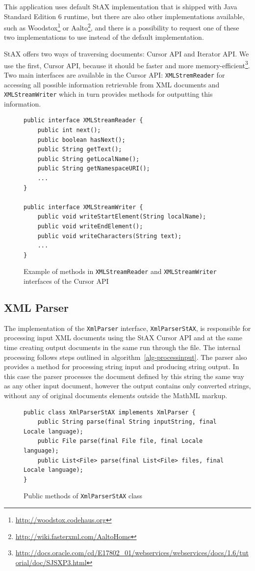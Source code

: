 \documentclass[11pt,oneside,final]{fithesis2}
\begin{document}
This application uses default StAX implementation that is shipped with Java Standard Edition 6 runtime, but there are also other implementations available, such as Woodstox\footnote{\url{http://woodstox.codehaus.org}} or Aalto\footnote{\url{http://wiki.fasterxml.com/AaltoHome}}, and there is a possibility to request one of these two implementations to use instead of the default implementation.

StAX offers two ways of traversing documents: Cursor API and Iterator API. We use the first, Cursor API, because it should be faster and more memory-efficient\footnote{\url{http://docs.oracle.com/cd/E17802_01/webservices/webservices/docs/1.6/tutorial/doc/SJSXP3.html}}. Two main interfaces are available in the Cursor API: \texttt{XMLStremReader} for accessing all possible information retrievable from XML documents and \texttt{XMLStreamWriter} which in turn provides methods for outputting this information. 

\begin{figure}[!ht]
\begin{lstlisting}
public interface XMLStreamReader {
	public int next();
   	public boolean hasNext();
   	public String getText();		
  	public String getLocalName();
  	public String getNamespaceURI();
  	...
} 

public interface XMLStreamWriter {
  	public void writeStartElement(String localName);
  	public void writeEndElement();
 	public void writeCharacters(String text);
	... 
}
\end{lstlisting}
\caption{Example of methods in \texttt{XMLStreamReader} and \texttt{XMLStreamWriter} interfaces of the Cursor API}
\label{fig:staxcursorapi}
\end{figure}

\subsection{XML Parser}
The implementation of the \texttt{XmlParser} interface, \texttt{XmlParserStAX}, is responsible for processing input XML documents using the StAX Cursor API and at the same time creating output documents in the same run through the file. The internal processing follows steps outlined in algorithm~\ref{alg-processinput}. The parser also provides a method for processing string input and producing string output. In this case the parser processes the document defined by this string the same way as any other input document, however the output contains only converted strings, without any of original documents elements outside the MathML markup.
\begin{figure}[!ht]
\begin{lstlisting}
public class XmlParserStAX implements XmlParser {
	public String parse(final String inputString, final Locale language);
	public File parse(final File file, final Locale language);
	public List<File> parse(final List<File> files, final Locale language);
}
\end{lstlisting}
\caption{Public methods of \texttt{XmlParserStAX} class}
\label{fig:xmlparserstax}
\end{figure}
\end{document}
